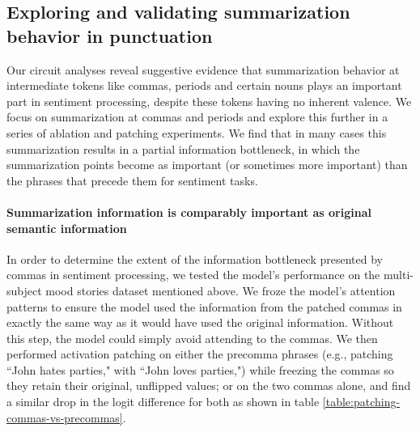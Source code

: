 \documentclass{article} %
\newcommand{\tokens}{\fontfamily{qhv}\selectfont \footnotesize}
\begin{document}
    \subsection{Exploring and validating summarization behavior in punctuation}\label{section:summarization}
    Our circuit analyses reveal suggestive evidence that summarization behavior at intermediate tokens like commas, periods and certain nouns plays an important part in sentiment processing, despite these tokens having no inherent valence. We focus on summarization at commas and periods and explore this further in a series of ablation and patching experiments. We find that in many cases this summarization results in a partial information bottleneck, in which the summarization points become as important (or sometimes more important) than the phrases that precede them for sentiment tasks.
        \paragraph{Summarization information is comparably important as original semantic information}
        In order to determine the extent of the information bottleneck presented by commas in sentiment processing, we tested the model's performance on the multi-subject mood stories dataset mentioned above. We froze the model's attention patterns to ensure the model used the information from the patched commas in exactly the same way as it would have used the original information. Without this step, the model could simply avoid attending to the commas. We then performed activation patching on either the precomma phrases (e.g., patching ``{\tokens John hates parties,}" with ``{\tokens John loves parties,}") while freezing the commas so they retain their original, unflipped values; or on the two commas alone, and find a similar drop in the logit difference for both as shown in table \ref{table:patching-commas-vs-precommas}.
\end{document}
